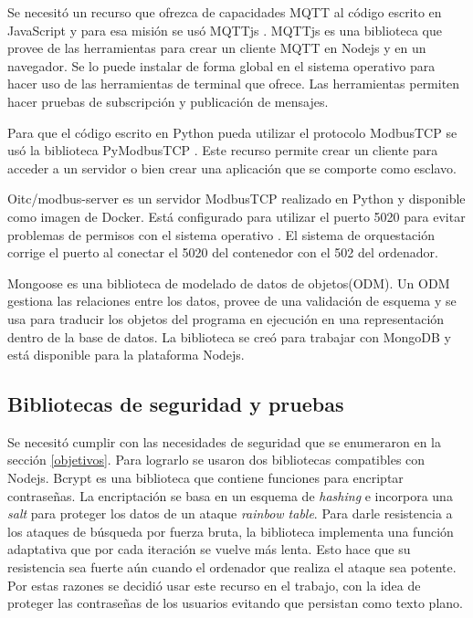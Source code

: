 Se necesitó un recurso que ofrezca de capacidades MQTT al código escrito en JavaScript y para esa misión se usó MQTTjs \citep{WEBSITE:MQTTjs}.
MQTTjs es una biblioteca que provee de las herramientas para crear un cliente MQTT en Nodejs y en un navegador.
Se lo puede instalar de forma global en el sistema operativo para hacer uso de las herramientas de terminal que ofrece.
Las herramientas permiten hacer pruebas de subscripción y publicación de mensajes.

Para que el código escrito en Python pueda utilizar el protocolo ModbusTCP se usó la biblioteca PyModbusTCP \citep{WEBSITE:pyModbusTCP}.
Este recurso permite crear un cliente para acceder a un servidor o bien crear una aplicación que se comporte como esclavo.

Oitc/modbus-server es un servidor ModbusTCP realizado en Python y disponible como imagen de Docker.
Está configurado para utilizar el puerto 5020 para evitar problemas de permisos con el sistema operativo \citep{WEBSITE:dockerhubModbus}.
El sistema de orquestación corrige el puerto al conectar el 5020 del contenedor con el 502 del ordenador.

Mongoose \citep{WEBSITE:mongoose} es una biblioteca de modelado de datos de objetos(ODM).
Un ODM gestiona las relaciones entre los datos, provee de una validación de esquema y se usa para traducir los objetos del programa en ejecución en una representación dentro de la base de datos.
La biblioteca se creó para trabajar con MongoDB y está disponible para la plataforma Nodejs.

\subsection{Bibliotecas de seguridad y pruebas}
Se necesitó cumplir con las necesidades de seguridad que se enumeraron en la sección \ref{objetivos}.
Para lograrlo se usaron dos bibliotecas compatibles con Nodejs.
Bcrypt es una biblioteca que contiene funciones para encriptar contraseñas.
La encriptación se basa en un esquema de \emph{hashing} e incorpora una \emph{salt} para proteger los datos de un ataque \emph{rainbow table}.
Para darle resistencia a los ataques de búsqueda por fuerza bruta, la biblioteca implementa una función adaptativa que por cada iteración se vuelve más lenta.
Esto hace que su resistencia sea fuerte aún cuando el ordenador que realiza el ataque sea potente.
Por estas razones se decidió usar este recurso en el trabajo, con la idea de proteger las contraseñas de los usuarios evitando que persistan como texto plano.

